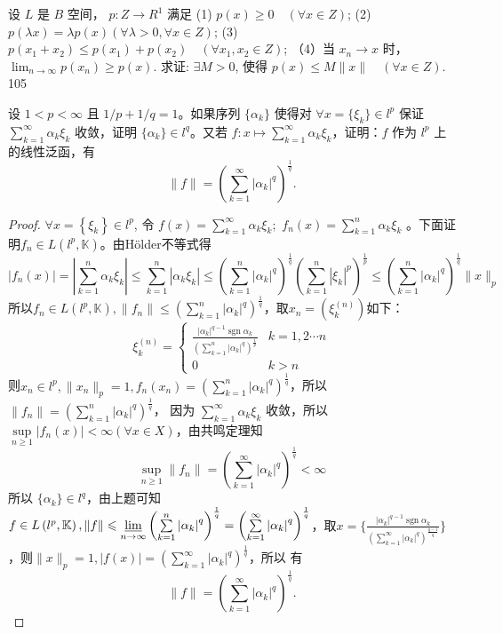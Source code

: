 \documentclass[lang=cn,newtx,10pt,scheme=chinese,thmcnt=chapter]{elegantbook}
\begin{document}
\begin{problem}设 $L$ 是 $B$ 空间， $p: Z \rightarrow R ^1$ 满足
(1) $p(x) \geqslant 0 \quad(\forall x \in Z )$;
(2) $p(\lambda x)=\lambda p(x)(\forall \lambda>0, \forall x \in Z )$;
(3) $p\left(x_1+x_2\right) \leqslant p\left(x_1\right)+p\left(x_2\right) \quad\left(\forall x_1, x_2 \in Z \right)$;
（4）当 $x_n \rightarrow x$ 时， $\lim _{n \rightarrow \infty} p\left(x_n\right) \geqslant p(x)$.
求证: $\exists M>0$, 使得 $p(x) \leqslant M\|x\| \quad(\forall x \in Z )$.
105
\end{problem}
\begin{problem}
设 $1 < p < \infty$ 且 $1/p + 1/q = 1$。如果序列 $\{\alpha_k\}$ 使得对 $\forall x = \{\xi_k\} \in l^p$ 保证 $\sum\limits_{k=1}^{\infty} \alpha_k \xi_k$ 收敛，证明 $\{\alpha_k\} \in l^q$。又若 $f: x \mapsto \sum\limits_{k=1}^{\infty} \alpha_k \xi_k$，证明：$f$ 作为 $l^p$ 上的线性泛函，有
\[
\|f\| = \left( \sum_{k=1}^{\infty} |\alpha_k|^q \right)^{\frac{1}{q}}.
\]
\end{problem}
\begin{proof}
     $\forall x=\left\{\xi_k\right\} \in l^p$, 令 $f(x)=\sum\limits_{k=1}^{\infty} \alpha_k \xi_k ;$ $f_n(x)=\sum\limits_{k=1}^n \alpha_k \xi_k$ 。下面证明$f_n \in {L} \left(l^p,\mathbb{ K} \right)$。由H\"older不等式得
\[|f_n(x)|=|\sum\limits_{k=1}^n \alpha_k \xi_k|\leqslant \sum\limits_{k=1}^n |\alpha_k \xi_k|\leqslant\left(\sum\limits_{k=1}^n \left|\alpha_k\right|^q \right)^{\frac{1}{q}}\left(\sum\limits_{k=1}^n \left|\xi_k\right|^p \right)^{\frac{1}{p}}\leqslant\left(\sum\limits_{k=1}^n \left|\alpha_k\right|^q \right)^{\frac{1}{q}}\|x\|_p\]
     所以$f_n \in {L} \left(l^p,\mathbb{ K} \right),\|f_n\|\leqslant\left(\sum\limits_{k=1}^n \left|\alpha_k\right|^q \right)^{\frac{1}{q}}$，取$x_n=(\xi^{(n)}_k)$如下：
    \[\xi_k^{(n)}=\begin{cases}
         \frac{|\alpha_k|^{q-1}\operatorname{sgn } \alpha_k}{\left(\sum\limits_{k=1}^n \left|\alpha_k\right|^q \right)^{\frac{1}{p}}}&k=1,2\cdots n\\
         0&k>n
     \end{cases}\]
则$x_n\in l^p,\|x_n\|_p=1,f_n(x_n)=\left(\sum\limits_{k=1}^n \left|\alpha_k\right|^q \right)^{\frac{1}{q}}$，所以$\|f_n\|=\left(\sum\limits_{k=1}^n \left|\alpha_k\right|^q \right)^{\frac{1}{q}}$， 因为 $\sum\limits_{k=1}^{\infty} \alpha_k \xi_k$ 收敛，所以$\sup\limits_{n\geqslant 1}|f_n(x)|<\infty(\forall x\in{X}
)$，由共鸣定理知
\[\sup\limits_{n\geqslant 1}\|f_n\|=\left(\sum\limits_{k=1}^\infty \left|\alpha_k\right|^q \right)^{\frac{1}{q}}<\infty\]
所以 $\{\alpha_k\} \in l^q$，由上题可知$f\in {L} \left(l^p,\mathbb{ K} \right),\|f\|\leqslant\varliminf\limits_{n\to \infty}\left(\sum\limits_{k=1}^n \left|\alpha_k\right|^q \right)^{\frac{1}{q}}=\left(\sum\limits_{k=1}^\infty \left|\alpha_k\right|^q \right)^{\frac{1}{q}} $，取$x=\{\frac{|\alpha_k|^{q-1}\operatorname{sgn}\alpha_k}{\left(\sum\limits_{k=1}^\infty \left|\alpha_k\right|^q \right)^{\frac{q-1}{q}}}\}$，则$\|x\|_p=1,|f(x)|=\left(\sum\limits_{k=1}^\infty \left|\alpha_k\right|^q \right)^{\frac{1}{q}}$，所以
有
\[
\|f\| = \left( \sum_{k=1}^{\infty} |\alpha_k|^q \right)^{\frac{1}{q}}.
\]
     
\end{proof}
\end{document}
